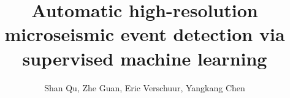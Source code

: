 
\title{Automatic high-resolution microseismic event detection via supervised machine learning}

\renewcommand{\thefootnote}{\fnsymbol{footnote}} 


\author{Shan Qu\footnotemark[1], Zhe Guan\footnotemark[2], Eric Verschuur\footnotemark[1],  Yangkang Chen\footnotemark[2]}
\address{
\footnotemark[1] Delft University of Technology, Delphi consortium \\
\footnotemark[2] Rice University, Applied Physics Program \\
\footnotemark[3] Bureau of Economic Geology, The University of Texas at Austin\\
}


\maketitle

